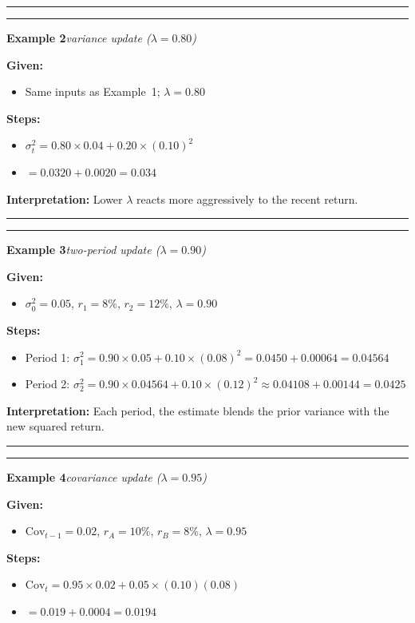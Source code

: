 \documentclass[
]{article}
\begin{document}
\noindent\rule{\linewidth}{0.4pt}
\medskip
\medskip
\noindent\rule{\linewidth}{0.4pt}
\noindent\textbf{Example 2}\enspace\textit{variance update ($\lambda=0.80$)}

\noindent\textbf{Given:}
\begin{itemize}\setlength{\itemsep}{3pt}
  \item Same inputs as Example~1; $\lambda=0.80$
\end{itemize}
\noindent\textbf{Steps:}
\begin{itemize}\setlength{\itemsep}{3pt}
  \item $\sigma_t^2 = 0.80\times0.04 + 0.20\times(0.10)^2$
  \item $= 0.0320 + 0.0020 = 0.034$
\end{itemize}

\noindent\textbf{Interpretation:} Lower $\lambda$ reacts more aggressively to the recent return.

\noindent\rule{\linewidth}{0.4pt}
\medskip
\medskip
\noindent\rule{\linewidth}{0.4pt}
\noindent\textbf{Example 3}\enspace\textit{two-period update ($\lambda=0.90$)}

\noindent\textbf{Given:}
\begin{itemize}\setlength{\itemsep}{3pt}
  \item $\sigma_0^2=0.05$, $r_1=8\%$, $r_2=12\%$, $\lambda=0.90$
\end{itemize}
\noindent\textbf{Steps:}
\begin{itemize}\setlength{\itemsep}{3pt}
  \item Period 1: $\sigma_1^2 = 0.90\times0.05 + 0.10\times(0.08)^2 = 0.0450+0.00064 = 0.04564$
  \item Period 2: $\sigma_2^2 = 0.90\times0.04564 + 0.10\times(0.12)^2 \approx 0.04108+0.00144 = 0.0425$
\end{itemize}

\noindent\textbf{Interpretation:} Each period, the estimate blends the prior variance with the new squared return.

\noindent\rule{\linewidth}{0.4pt}
\medskip
\medskip
\noindent\rule{\linewidth}{0.4pt}
\noindent\textbf{Example 4}\enspace\textit{covariance update ($\lambda=0.95$)}

\noindent\textbf{Given:}
\begin{itemize}\setlength{\itemsep}{3pt}
  \item $\text{Cov}_{t-1}=0.02$, $r_A=10\%$, $r_B=8\%$, $\lambda=0.95$
\end{itemize}
\noindent\textbf{Steps:}
\begin{itemize}\setlength{\itemsep}{3pt}
  \item $\text{Cov}_t = 0.95\times0.02 + 0.05\times(0.10)(0.08)$
  \item $= 0.019 + 0.0004 = 0.0194$
\end{itemize}
\end{document}
